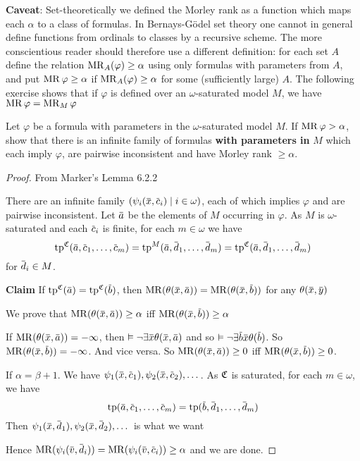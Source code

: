 \documentclass[11pt]{article}
\begin{document}
\textbf{Caveat}: Set-theoretically we defined the Morley rank as a function which maps each \(\alpha\) to a class
of formulas. In Bernays-Gödel set theory one cannot in general define functions from ordinals to
classes by a recursive scheme. The more conscientious reader should therefore use a different
definition: for each set \(A\) define the relation \(\operatorname{MR}_A(\varphi)\ge\alpha\) using only formulas with
parameters from \(A\), and put \(\operatorname{MR}\varphi\ge\alpha\) if \(\operatorname{MR}_A(\varphi)\ge\alpha\) for some (sufficiently large) \(A\).
The following exercise shows that if \(\varphi\) is defined over an \(\omega\)-saturated model \(M\), we
have \(\operatorname{MR}\varphi=\operatorname{MR}_M\varphi\)

\begin{exercise}
\label{ex6.2.1}
Let \(\varphi\) be a formula with parameters in the \(\omega\)-saturated model \(M\). If \(\operatorname{MR}\varphi>\alpha\), show that
there is an infinite family of formulas \textbf{with parameters in} \(M\) which each imply \(\varphi\), are
pairwise inconsistent and have Morley rank \(\ge\alpha\).
\end{exercise}

\begin{proof}
From Marker's Lemma 6.2.2

There are an infinite family \((\psi_i(\barx,\barc_i)\mid i\in\omega)\), each of which implies \(\varphi\) and are
pairwise inconsistent. Let \(\bara\) be the elements of \(M\) occurring in \(\varphi\). As \(M\) is
\(\omega\)-saturated and each \(\barc_i\) is finite, for each \(m\in\omega\) we have
\begin{equation*}
\tp^{\fC}(\bara,\barc_1,\dots,\barc_m)=\tp^{M}(\bara,\bard_1,\dots,\bard_m)=\tp^{\fC}(\bara,\bard_1,\dots,\bard_m)
\end{equation*}
for \(\bard_i\in M\).

\textbf{Claim} If \(\tp^{\fC}(\bara)=\tp^{\fC}(\barb)\), then \(\MR(\theta(\barx,\bara))=\MR(\theta(\barx,\barb))\) for
any \(\theta(\barx,\bary)\)

We prove that \(\MR(\theta(\barx,\bara))\ge\alpha\) iff \(\MR(\theta(\barx,\barb))\ge\alpha\)

If \(\MR(\theta(\barx,\bara))=-\infty\), then \(\vDash\neg\exists\barx\theta(\barx,\bara)\) and so \(\vDash\neg\exists\barb\barx\theta(\barb)\).
So \(\MR(\theta(\barx,\barb))=-\infty\). And vice versa. So \(\MR(\theta(\barx,\bara))\ge 0\)
iff \(\MR(\theta(\barx,\barb))\ge 0\).

If \(\alpha=\beta+1\). We have \(\psi_1(\barx,\barc_1),\psi_2(\barx,\barc_2),\dots\). As \(\mathfrak{C}\) is saturated, for
each \(m\in\omega\), we have
\begin{equation*}
\tp(\bara,\barc_1,\dots,\barc_m)=\tp(\barb,\bard_1,\dots,\bard_m)
\end{equation*}
Then \(\psi_1(\barx,\bard_1),\psi_2(\barx,\bard_2),\dots\) is what we want

Hence \(\MR(\psi_i(\barv,\bard_i))=\MR(\psi_i(\barv,\barc_i))\ge\alpha\) and we are done.
\end{proof}
\end{document}
